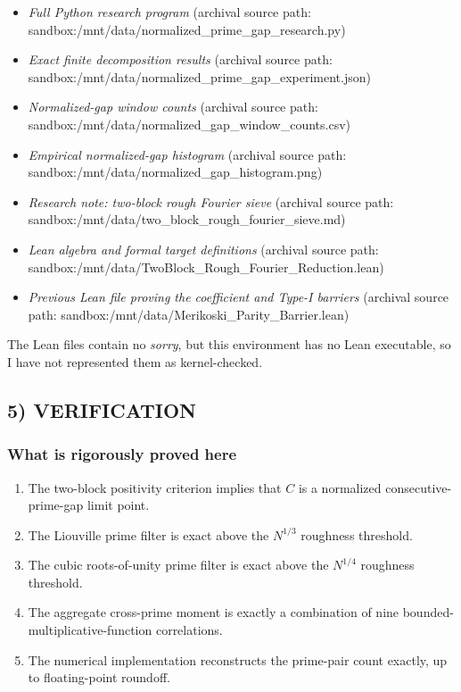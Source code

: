 \begin{itemize}
\item \emph{Full Python research program} (archival source path: sandbox:/mnt/data/normalized_prime_gap_research.py)
\item \emph{Exact finite decomposition results} (archival source path: sandbox:/mnt/data/normalized_prime_gap_experiment.json)
\item \emph{Normalized-gap window counts} (archival source path: sandbox:/mnt/data/normalized_gap_window_counts.csv)
\item \emph{Empirical normalized-gap histogram} (archival source path: sandbox:/mnt/data/normalized_gap_histogram.png)
\item \emph{Research note: two-block rough Fourier sieve} (archival source path: sandbox:/mnt/data/two_block_rough_fourier_sieve.md)
\item \emph{Lean algebra and formal target definitions} (archival source path: sandbox:/mnt/data/TwoBlock_Rough_Fourier_Reduction.lean)
\item \emph{Previous Lean file proving the coefficient and Type-I barriers} (archival source path: sandbox:/mnt/data/Merikoski_Parity_Barrier.lean)
\end{itemize}

The Lean files contain no \emph{sorry}, but this environment has no Lean executable, so I have not represented them as kernel-checked.

\subsection*{5) VERIFICATION}

\subsubsection*{What is rigorously proved here}

\begin{enumerate}
\item The two-block positivity criterion implies that \(C\) is a normalized consecutive-prime-gap limit point.
\item The Liouville prime filter is exact above the \(N^{1/3}\) roughness threshold.
\item The cubic roots-of-unity prime filter is exact above the \(N^{1/4}\) roughness threshold.
\item The aggregate cross-prime moment is exactly a combination of nine bounded-multiplicative-function correlations.
\item The numerical implementation reconstructs the prime-pair count exactly, up to floating-point roundoff.
\end{enumerate}


